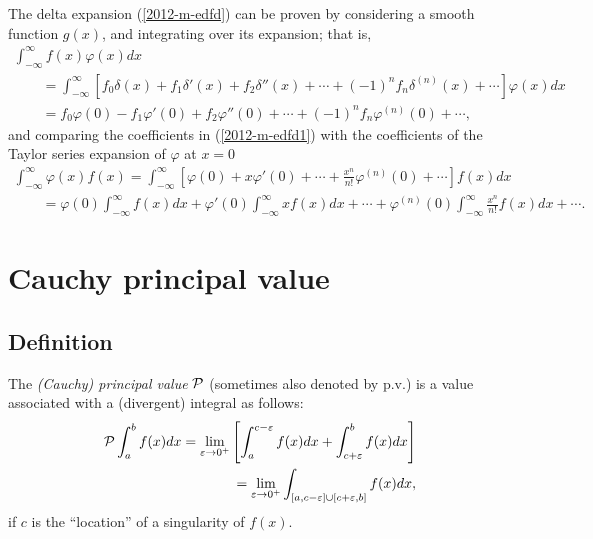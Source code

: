 {\color{OliveGreen}
\bproof
The delta expansion (\ref{2012-m-edfd}) can be proven by considering a smooth function $g(x)$, and integrating over its expansion; that is,
\begin{equation}
\begin{split}
 \int_{-\infty}^\infty  f(x) \varphi (x) dx  \\
\qquad =
 \int_{-\infty}^\infty   \left[
f_0 \delta (x) +
f_1 \delta' (x) +
f_2 \delta'' (x)
+ \cdots  +
(-1)^n f_n \delta^{(n)}(x)
+ \cdots \right]\varphi (x)  dx \\
\qquad =
f_0  \varphi (0) - f_1  \varphi' (0) + f_2  \varphi'' (0) +\cdots  + (-1)^n f_n  \varphi^{(n)}(0)
+ \cdots
,
\end{split}
\label{2012-m-edfd1}
\end{equation}
and comparing the coefficients in (\ref{2012-m-edfd1})
with the coefficients  of  the Taylor series expansion of $\varphi$ at $x=0$
\begin{equation}
\begin{split}
 \int_{-\infty}^\infty  \varphi (x) f(x)  =
 \int_{-\infty}^\infty  \left[
 \varphi (0) +x  \varphi' (0) + \cdots + \frac{x^n}{n!} \varphi^{(n)} (0)  + \cdots
 \right] f(x) dx \\
\qquad =
 \varphi (0) \int_{-\infty}^\infty  f(x) dx  +  \varphi' (0) \int_{-\infty}^\infty x f(x) dx   + \cdots +  \varphi^{(n)} (0)\int_{-\infty}^\infty \frac{x^n}{n!} f(x) dx  + \cdots
.
\end{split}
\label{2012-m-edfd2tse1}
\end{equation}
\eproof
}



\section{Cauchy principal value}

\subsection{Definition}

The {\em  (Cauchy) principal value} ${\cal P}$ (sometimes also denoted by $\textrm{p.v.}$)
is a value associated with a (divergent) integral as follows:
\begin{equation}
\begin{split}
{\cal P}
\int_{a}^b f(x) dx
= \lim_{\varepsilon \rightarrow 0^+}
\left[
\int_{a}^{c-\varepsilon} f(x) dx
+
\int_{c+\varepsilon}^{b} f(x) dx
\right]
\\
\qquad
=  \lim_{\varepsilon \rightarrow 0^+}
\int_{[a,c-\varepsilon] \cup [c+\varepsilon,b]}   f(x) dx
,
\end{split}
\end{equation}
if $c$ is the ``location'' of a singularity of $f(x)$.


